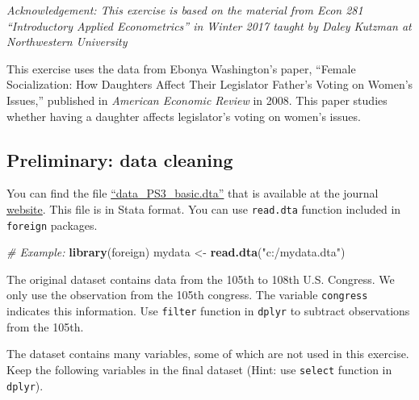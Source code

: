 \documentclass[]{book}
\newenvironment{Shaded}{\begin{snugshade}}{\end{snugshade}}
\newcommand{\KeywordTok}[1]{\textcolor[rgb]{0.13,0.29,0.53}{\textbf{#1}}}
\newcommand{\StringTok}[1]{\textcolor[rgb]{0.31,0.60,0.02}{#1}}
\newcommand{\CommentTok}[1]{\textcolor[rgb]{0.56,0.35,0.01}{\textit{#1}}}
\newcommand{\NormalTok}[1]{#1}
\begin{document}
\emph{Acknowledgement: This exercise is based on the material from Econ
281 ``Introductory Applied Econometrics'' in Winter 2017 taught by Daley
Kutzman at Northwestern University}

This exercise uses the data from Ebonya Washington's paper, ``Female
Socialization: How Daughters Affect Their Legislator Father's Voting on
Women's Issues,'' published in \emph{American Economic Review} in 2008.
This paper studies whether having a daughter affects legislator's voting
on women's issues.

\subsection{Preliminary: data cleaning}\label{preliminary-data-cleaning}

You can find the file
\href{data_PS3_basic.dta}{``data\_PS3\_basic.dta''} that is available at
the journal
\href{https://www.aeaweb.org/articles?id=10.1257/aer.98.1.311}{website}.
This file is in Stata format. You can use \texttt{read.dta} function
included in \texttt{foreign} packages.

\begin{Shaded}
\begin{Highlighting}[]
\CommentTok{# Example: }
\KeywordTok{library}\NormalTok{(foreign)}
\NormalTok{mydata <-}\StringTok{ }\KeywordTok{read.dta}\NormalTok{(}\StringTok{"c:/mydata.dta"}\NormalTok{)}
\end{Highlighting}
\end{Shaded}

The original dataset contains data from the 105th to 108th U.S.
Congress. We only use the observation from the 105th congress. The
variable \texttt{congress} indicates this information. Use
\texttt{filter} function in \texttt{dplyr} to subtract observations from
the 105th.

The dataset contains many variables, some of which are not used in this
exercise. Keep the following variables in the final dataset (Hint: use
\texttt{select} function in \texttt{dplyr}).
\end{document}
